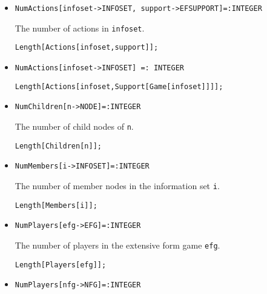 \begin{itemize}
\item{}
\protect \large \begin{verbatim}
NumActions[infoset->INFOSET, support->EFSUPPORT]=:INTEGER
\end{verbatim}\normalsize

\bd 
The number of actions in \verb+infoset+.
\begin{verbatim}
Length[Actions[infoset,support]]; 
\end{verbatim} 
\ed

\item{}
\protect \large \begin{verbatim}
NumActions[infoset->INFOSET] =: INTEGER
\end{verbatim}\normalsize

\bd \begin{verbatim}
Length[Actions[infoset,Support[Game[infoset]]]]; 
\end{verbatim} 
\ed

\item{}
\protect \large \begin{verbatim}
NumChildren[n->NODE]=:INTEGER
\end{verbatim}\normalsize

\bd 
The number of child nodes of \verb+n+.
\begin{verbatim}
Length[Children[n]];
\end{verbatim} 
\ed

\item{}
\protect \large \begin{verbatim}
NumMembers[i->INFOSET]=:INTEGER
\end{verbatim}\normalsize

\bd 
The number of member nodes in the information set \verb+i+.
\begin{verbatim}
Length[Members[i]];
\end{verbatim} 
\ed

\item{}
\protect \large \begin{verbatim}
NumPlayers[efg->EFG]=:INTEGER
\end{verbatim}\normalsize

\bd 
The number of players in the extensive form game \verb+efg+.
\begin{verbatim}
Length[Players[efg]];
\end{verbatim} 
\ed

\item{}
\protect \large \begin{verbatim}
NumPlayers[nfg->NFG]=:INTEGER
\end{verbatim}\normalsize


\end{itemize}
